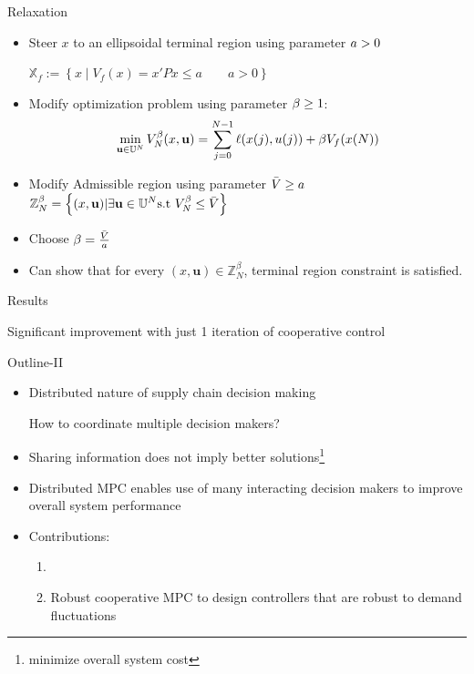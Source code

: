 \documentclass[table]{beamer}
\newcommand\bu {\mathbf{u}}
\newcommand{\set}[1]{\left\lbrace #1 \right\rbrace}
\newcommand{\Redm}[1]{{\color{red}{#1}}}
\begin{document}
{
\begin{frame}{Relaxation}
\begin{itemize}
 \item  Steer $x$ to an ellipsoidal terminal region using parameter
     $\Redm{a > 0}$ \newline
    \centerline{{$\displaystyle \mathbb{X}_f:= \set{x \mid  V_f(x) = x'Px \leq a \qquad a > 0}$}}
   
 \item Modify optimization problem using parameter $\Redm{\beta\geq 1}$:
   \[ \min_{\bu \in \mathbb{U}^N}{V_N^{\Redm{\beta}}(x,\bu) =
     \sum_{j=0}^{N-1}\ell(x(j),u(j)) + \Redm{\beta}V_f(x(N))}\]
      
 \item Modify Admissible region using parameter $\Redm{\bar{V} \geq a}$
  $\displaystyle \mathbb{Z}_N^{\Redm{\beta}} = \set{(x,\bu) \vert
    \exists \bu \in \mathbb{U}^N \text{s.t~} V_N^{\Redm{\beta}} \leq
    \bar{V}}$
  
\item Choose $\Redm{\beta}= \frac{\bar{V}} {a}$
 
\item Can show that for every $(x,\bu) \in \mathbb{Z}_N^{\beta}$,
  terminal region constraint is satisfied.  
\end{itemize}
\end{frame}
}

\begin{frame}{Results}
\begin{figure}
 \centering
  \resizebox{1\textwidth}{!}{}
\end{figure}
\centerline{Significant improvement with just 1 iteration of
  cooperative control}
\end{frame}

{\NoHeaderFooter 
\begin{frame}{Outline-II}
\begin{itemize}
\item Distributed nature of supply chain decision making \\
 \centerline{\alert{ How to coordinate multiple decision makers?}}
\item Sharing information does not imply better
  solutions\footnote{minimize overall system cost}  

\item \alert{Distributed} MPC enables use of many interacting decision
  makers to improve overall system performance\footnotemark[\value{footnote}] 

\item Contributions:
 \begin{enumerate}
   \item {\color{gray}{Stability \& convergence guarantees extended to cover supply
     chain models}} 
   \item {\color{blue} {Robust cooperative MPC to design controllers
       that are robust to demand fluctuations}}
 \end{enumerate}
\end{itemize}
\end{frame}
}
\end{document}
